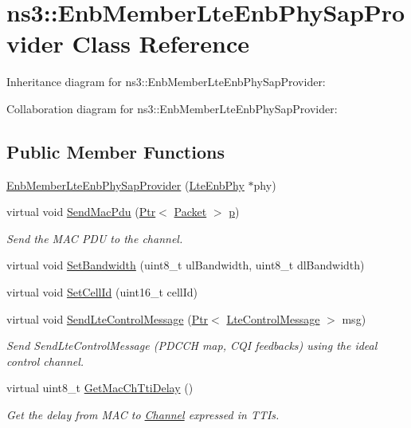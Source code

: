 \hypertarget{classns3_1_1EnbMemberLteEnbPhySapProvider}{}\section{ns3\+:\+:Enb\+Member\+Lte\+Enb\+Phy\+Sap\+Provider Class Reference}
\label{classns3_1_1EnbMemberLteEnbPhySapProvider}


Inheritance diagram for ns3\+:\+:Enb\+Member\+Lte\+Enb\+Phy\+Sap\+Provider\+:


Collaboration diagram for ns3\+:\+:Enb\+Member\+Lte\+Enb\+Phy\+Sap\+Provider\+:
\subsection*{Public Member Functions}
\begin{DoxyCompactItemize}
\item 
\hyperlink{classns3_1_1EnbMemberLteEnbPhySapProvider_a463f5ee553d9799102a5688b26126afe}{Enb\+Member\+Lte\+Enb\+Phy\+Sap\+Provider} (\hyperlink{classns3_1_1LteEnbPhy}{Lte\+Enb\+Phy} $\ast$phy)
\item 
virtual void \hyperlink{classns3_1_1EnbMemberLteEnbPhySapProvider_a6df331066c8b2bd05402340ec5ded518}{Send\+Mac\+Pdu} (\hyperlink{classns3_1_1Ptr}{Ptr}$<$ \hyperlink{classns3_1_1Packet}{Packet} $>$ \hyperlink{lte__link__budget__x2__handover__measures_8m_ac9de518908a968428863f829398a4e62}{p})
\begin{DoxyCompactList}\small\item\em Send the M\+AC P\+DU to the channel. \end{DoxyCompactList}\item 
virtual void \hyperlink{classns3_1_1EnbMemberLteEnbPhySapProvider_a8a391b3486c0a936f64cbd7b13454c8f}{Set\+Bandwidth} (uint8\+\_\+t ul\+Bandwidth, uint8\+\_\+t dl\+Bandwidth)
\item 
virtual void \hyperlink{classns3_1_1EnbMemberLteEnbPhySapProvider_aaca00aecc61ee56324e3365f98271ce0}{Set\+Cell\+Id} (uint16\+\_\+t cell\+Id)
\item 
virtual void \hyperlink{classns3_1_1EnbMemberLteEnbPhySapProvider_afab7dc51ebeae7a549ecc28ff98d4bfe}{Send\+Lte\+Control\+Message} (\hyperlink{classns3_1_1Ptr}{Ptr}$<$ \hyperlink{classns3_1_1LteControlMessage}{Lte\+Control\+Message} $>$ msg)
\begin{DoxyCompactList}\small\item\em Send Send\+Lte\+Control\+Message (P\+D\+C\+CH map, C\+QI feedbacks) using the ideal control channel. \end{DoxyCompactList}\item 
virtual uint8\+\_\+t \hyperlink{classns3_1_1EnbMemberLteEnbPhySapProvider_aa14f355e8ffab6a6eb44c5c1285d2f81}{Get\+Mac\+Ch\+Tti\+Delay} ()
\begin{DoxyCompactList}\small\item\em Get the delay from M\+AC to \hyperlink{classns3_1_1Channel}{Channel} expressed in T\+T\+Is. \end{DoxyCompactList}\end{DoxyCompactItemize}
